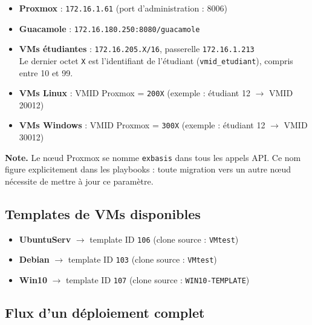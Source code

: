 \documentclass[a4paper]{article}
\newcommand{\cmd}[1]{\texttt{#1}}
\begin{document}
\begin{itemize}
  \item \textbf{Proxmox} : \cmd{172.16.1.61} (port d'administration : 8006)
  \item \textbf{Guacamole} : \cmd{172.16.180.250:8080/guacamole}
  \item \textbf{VMs étudiantes} : \cmd{172.16.205.X/16}, passerelle \cmd{172.16.1.213}\\
        Le dernier octet \cmd{X} est l'identifiant de l'étudiant (\cmd{vmid\_etudiant}), compris entre 10 et 99.
  \item \textbf{VMs Linux} : VMID Proxmox = \cmd{200X} (exemple : étudiant 12 \(\to\) VMID 20012)
  \item \textbf{VMs Windows} : VMID Proxmox = \cmd{300X} (exemple : étudiant 12 \(\to\) VMID 30012)
\end{itemize}

\begin{infobox}
  \textbf{Note.} Le nœud Proxmox se nomme \cmd{exbasis} dans tous les appels API. Ce nom figure explicitement dans les playbooks : toute migration vers un autre nœud nécessite de mettre à jour ce paramètre.
\end{infobox}

\subsection{Templates de VMs disponibles}

\begin{itemize}
  \item \textbf{UbuntuServ} \(\to\) template ID \cmd{106} (clone source : \cmd{VMtest})
  \item \textbf{Debian} \(\to\) template ID \cmd{103} (clone source : \cmd{VMtest})
  \item \textbf{Win10} \(\to\) template ID \cmd{107} (clone source : \cmd{WIN10-TEMPLATE})
\end{itemize}

\subsection{Flux d'un déploiement complet}
\end{document}
